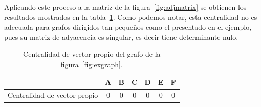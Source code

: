 Aplicando este proceso a la matriz de la figura~\ref{fig:adjmatrix} se obtienen
los resultados mostrados en la tabla~\ref{tab:exeigen}. Como podemos notar, esta
centralidad no es adecuada para grafos dirigidos tan pequeños como el presentado
en el ejemplo, pues su matriz de adyacencia es singular, es decir tiene
determinante nulo.
\begin{table}[htpb]
  \centering
  \begin{tabular}{|l|c|c|c|c|c|c|}
    \hline         &  A  &  B  &  C  &  D  &  E  &  F  \\\hline
    Centralidad de vector propio & $0$ & $0$ & $0$ & $0$ & $0$ & $0$ \\\hline
  \end{tabular}
  \caption{Centralidad de vector propio del grafo de la
    figura~\ref{fig:exgraph}.}
  \label{tab:exeigen}
\end{table}

